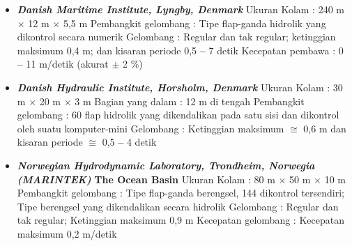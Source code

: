 \documentclass[12pt,a4paper]{report}
\begin{document}
\begin{itemize}

\item[\textbf{f.}]  \textbf{\textit{Danish Maritime Institute, Lyngby,
Denmark}}\newline
Ukuran Kolam : 240 m $\times$ 12 m $\times$ 5,5 m\newline
Pembangkit gelombang : Tipe flap-ganda hidrolik yang dikontrol secara numerik%
\newline
Gelombang : Regular dan tak regular; ketinggian maksimum 0,4 m; dan kisaran
periode 0,5 \textbf{--} 7 detik\newline
Kecepatan pembawa : 0 \textbf{--} 11 m/detik (akurat $\pm$ 2 \%)\newline

\item[\textbf{g.}]  \textbf{\textit{Danish Hydraulic Institute, Horsholm,
Denmark}}\newline
Ukuran Kolam : 30 m $\times$ 20 m $\times$ 3 m\newline
Bagian yang dalam : 12 m di tengah\newline
Pembangkit gelombang : 60 flap hidrolik yang dikendalikan pada satu sisi dan
dikontrol oleh suatu komputer-mini\newline
Gelombang : Ketinggian maksimum $\cong$ 0,6 m dan kisaran periode $\cong$
0,5 \textbf{--} 4 detik\newline

\item[\textbf{h.}]  \textbf{\textit{Norwegian Hydrodynamic Laboratory,
Trondheim, Norwegia (MARINTEK)}}\newline
\textbf{The Ocean Basin}\newline
Ukuran Kolam : 80 m $\times$ 50 m $\times$ 10 m\newline
Pembangkit gelombang : Tipe flap-ganda berengsel, 144 dikontrol tersendiri;
Tipe berengsel yang dikendalikan secara hidrolik\newline
Gelombang : Regular dan tak regular; Ketinggian maksimum 0,9 m \newline
Kecepatan gelombang : Kecepatan maksimum 0,2 m/detik\newline
\end{itemize}
\end{document}

